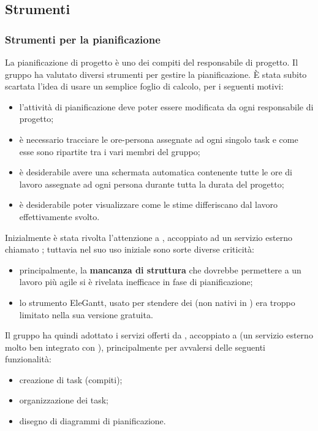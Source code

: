\subsection{Strumenti}

\subsubsection{Strumenti per la pianificazione}
La pianificazione di progetto è uno dei compiti del responsabile di progetto. Il gruppo ha valutato diversi strumenti per gestire la pianificazione. È stata subito scartata l'idea di usare un semplice foglio di calcolo, per i seguenti motivi:
\begin{itemize}
	\item l'attività di pianificazione deve poter essere modificata da ogni responsabile di progetto;
	\item è necessario tracciare le ore-persona assegnate ad ogni singolo task e come esse sono ripartite tra i vari membri del gruppo;
	\item è desiderabile avere una schermata automatica contenente tutte le ore di lavoro assegnate ad ogni persona durante tutta la durata del progetto;
	\item è desiderabile poter visualizzare come le stime differiscano dal lavoro effettivamente svolto.
\end{itemize}
Inizialmente è stata rivolta l'attenzione a , accoppiato ad un servizio esterno chiamato ; tuttavia nel suo uso iniziale sono sorte diverse criticità:
\begin{itemize}
	\item principalmente, la \textbf{mancanza di struttura} che dovrebbe permettere a  un lavoro più agile si è rivelata inefficace in fase di pianificazione;
	\item lo strumento EleGantt, usato per stendere dei  (non nativi in ) era troppo limitato nella sua versione gratuita.
\end{itemize}
Il gruppo ha quindi adottato i servizi offerti da , accoppiato a  (un servizio esterno molto ben integrato con ), principalmente per avvalersi delle seguenti funzionalità:
\begin{itemize}
	\item creazione di task (compiti);
	\item organizzazione dei task;
	\item disegno di diagrammi di pianificazione.
\end{itemize}
